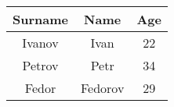 \begin{tabular}{|c|c|c|}
\hline
Surname & Name & Age\\ \hline
Ivanov & Ivan & 22\\ \hline
Petrov & Petr & 34\\ \hline
Fedor & Fedorov & 29 \\ \hline
\end{tabular}